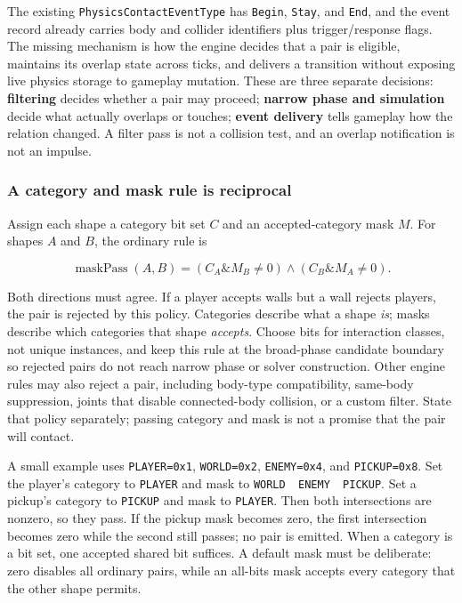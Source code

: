 The existing \texttt{PhysicsContactEventType} has \texttt{Begin}, \texttt{Stay}, and \texttt{End}, and the event record already carries body and collider identifiers plus trigger/response flags. The missing mechanism is how the engine decides that a pair is eligible, maintains its overlap state across ticks, and delivers a transition without exposing live physics storage to gameplay mutation. These are three separate decisions: \textbf{filtering} decides whether a pair may proceed; \textbf{narrow phase and simulation} decide what actually overlaps or touches; \textbf{event delivery} tells gameplay how the relation changed. A filter pass is not a collision test, and an overlap notification is not an impulse.

\subsubsection{A category and mask rule is reciprocal}\label{05-engine-i-ch017-a-category-and-mask-rule-is-reciprocal}

Assign each shape a category bit set \(C\) and an accepted-category mask \(M\). For shapes \(A\) and \(B\), the ordinary rule is

\[
\operatorname{maskPass}(A,B) = (C_A \mathbin{\&} M_B \ne 0) \land (C_B \mathbin{\&} M_A \ne 0).
\]

Both directions must agree. If a player accepts walls but a wall rejects players, the pair is rejected by this policy. Categories describe what a shape \emph{is}; masks describe which categories that shape \emph{accepts}. Choose bits for interaction classes, not unique instances, and keep this rule at the broad-phase candidate boundary so rejected pairs do not reach narrow phase or solver construction. Other engine rules may also reject a pair, including body-type compatibility, same-body suppression, joints that disable connected-body collision, or a custom filter. State that policy separately; passing category and mask is not a promise that the pair will contact.

A small example uses \texttt{PLAYER=0x1}, \texttt{WORLD=0x2}, \texttt{ENEMY=0x4}, and \texttt{PICKUP=0x8}. Set the player's category to \texttt{PLAYER} and mask to \texttt{WORLD\ \textbar{}\ ENEMY\ \textbar{}\ PICKUP}. Set a pickup's category to \texttt{PICKUP} and mask to \texttt{PLAYER}. Then both intersections are nonzero, so they pass. If the pickup mask becomes zero, the first intersection becomes zero while the second still passes; no pair is emitted. When a category is a bit set, one accepted shared bit suffices. A default mask must be deliberate: zero disables all ordinary pairs, while an all-bits mask accepts every category that the other shape permits.

